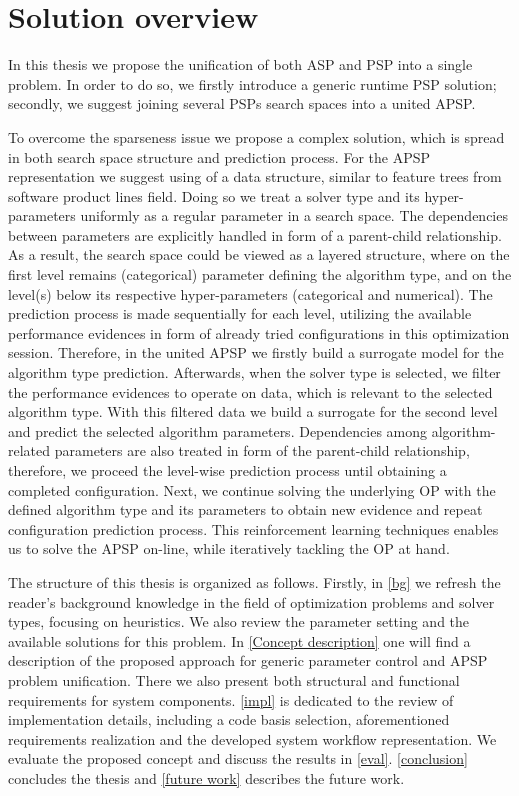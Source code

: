 \section{Solution overview}
In this thesis we propose the unification of both ASP and PSP into a single problem. In order to do so, we firstly introduce a generic runtime PSP solution; secondly, we suggest joining several PSPs search spaces into a united APSP.

To overcome the sparseness issue we propose a complex solution, which is spread in both search space structure and prediction process. For the APSP representation we suggest using of a data structure, similar to feature trees from software product lines field. Doing so we treat a solver type and its hyper-parameters uniformly as a regular parameter in a search space. The dependencies between parameters are explicitly handled in form of a parent-child relationship. As a result, the search space could be viewed as a layered structure, where on the first level remains (categorical) parameter defining the algorithm type, and on the level(s) below its respective hyper-parameters (categorical and numerical). The prediction process is made sequentially for each level, utilizing the available performance evidences in form of already tried configurations in this optimization session. Therefore, in the united APSP we firstly build a surrogate model for the algorithm type prediction. Afterwards, when the solver type is selected, we filter the performance evidences to operate on data, which is relevant to the selected algorithm type. With this filtered data we build a surrogate for the second level and predict the selected algorithm parameters. Dependencies among algorithm-related parameters are also treated in form of the parent-child relationship, therefore, we proceed the level-wise prediction process until obtaining a completed configuration. Next, we continue solving the underlying OP with the defined algorithm type and its parameters to obtain new evidence and repeat configuration prediction process. This reinforcement learning techniques enables us to solve the APSP on-line, while iteratively tackling the OP at hand. 

The structure of this thesis is organized as follows. Firstly, in \cref{bg} we refresh the reader's background knowledge in the field of optimization problems and solver types, focusing on heuristics. We also review the parameter setting and the available solutions for this problem. In \cref{Concept description} one will find a description of the proposed approach for generic parameter control and APSP problem unification. There we also present both structural and functional requirements for system components. \cref{impl} is dedicated to the review of implementation details, including a code basis selection, aforementioned requirements realization and the developed system workflow representation. We evaluate the proposed concept and discuss the results in \cref{eval}. \cref{conclusion} concludes the thesis and \cref{future work} describes the future work.
